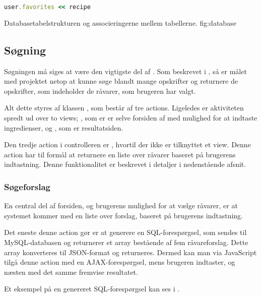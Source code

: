 \begin{lstlisting}[caption={Hvis man har et \classref{User}-objekt i \texttt{user} (som f.eks. returneret med \lstinline{User.find_by_id(42)}) og et \classref{Recipe}-object i \texttt{recipe}, kan opskriften associeres med brugeren med denne linje Ruby-kode.},label=lst:rubymanytomany,language=Ruby]
user.favorites << recipe
\end{lstlisting}
  {Databasetabelstrukturen og associeringerne mellem tabellerne.}
  {fig:database}

\subsection{Søgning}
\label{sec:funktionalitet-soegning}
Søgningen må siges at være den vigtigste del af \Foodl. Som beskrevet i , så er målet med projektet netop at kunne søge blandt mange opskrifter og returnere de opskrifter, som indeholder de råvarer, som brugeren har valgt.

Alt dette styres af klassen , som består af tre actions. Ligeledes er aktiviteten spredt ud over to views; , som er er selve forsiden af \Foodl med mulighed for at indtaste ingredienser, og , som er resultatsiden.

Den tredje action i controlleren er , hvortil der ikke er tilknyttet et view. Denne action har til formål at returnere en liste over råvarer baseret på brugerens indtastning. Denne funktionalitet er beskrevet i detaljer i nedenstående afsnit.

\subsubsection{Søgeforslag}
En central del af forsiden, og brugerens mulighed for at vælge råvarer, er at systemet kommer med en liste over forslag, baseret på brugerens indtastning.

Det eneste denne action gør er at generere en SQL-forespørgsel, som sendes til MySQL-databasen og returnerer et array bestående af fem råvareforslag. Dette array konverteres til JSON-format og returneres. Dermed kan man via JavaScript tilgå denne action med en AJAX-forespørgsel, mens brugeren indtaster, og næsten med det samme fremvise resultatet.

Et eksempel på en genereret SQL-forespørgsel kan ses i .

